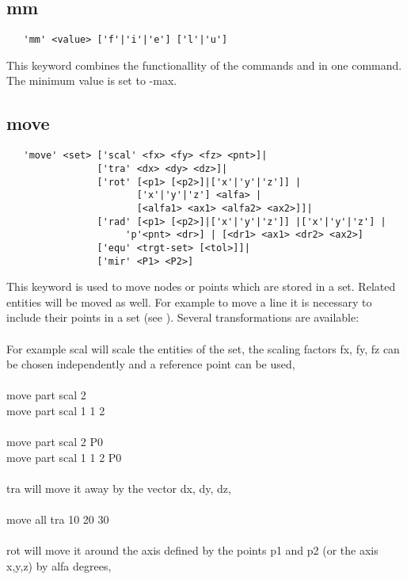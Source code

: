 \documentclass{article}
\begin{document}
\subsection{\label{mm}mm}
\begin{verbatim}
   'mm' <value> ['f'|'i'|'e'] ['l'|'u']
\end{verbatim}
This keyword combines the functionallity of the commands  and  in one command. The minimum value is set to -max.

\subsection{\label{move}move}
\begin{verbatim}
   'move' <set> ['scal' <fx> <fy> <fz> <pnt>]|
                ['tra' <dx> <dy> <dz>]|
                ['rot' [<p1> [<p2>]|['x'|'y'|'z']] |
                       ['x'|'y'|'z'] <alfa> |
                       [<alfa1> <ax1> <alfa2> <ax2>]]|
                ['rad' [<p1> [<p2>]|['x'|'y'|'z']] |['x'|'y'|'z'] |
                     'p'<pnt> <dr>] | [<dr1> <ax1> <dr2> <ax2>]
                ['equ' <trgt-set> [<tol>]]|
                ['mir' <P1> <P2>]
\end{verbatim}
This keyword is used to move nodes or points which are stored in a set. Related entities will be moved as well. For example to move a line it is necessary to include their points in a set (see ). Several transformations are available:\\\\For example scal will scale the entities of the set, the scaling factors fx, fy, fz can be chosen independently and a reference point can be used,\\\\
move part scal 2 \\
move part scal 1 1 2\\\\
move part scal 2 P0\\
move part scal 1 1 2 P0\\\\
tra will move it away by the vector dx, dy, dz,\\\\
move all tra 10 20 30 \\\\
rot will move it around the axis defined by the points p1 and p2 (or the axis x,y,z) by alfa degrees,\\\\
\end{document}
